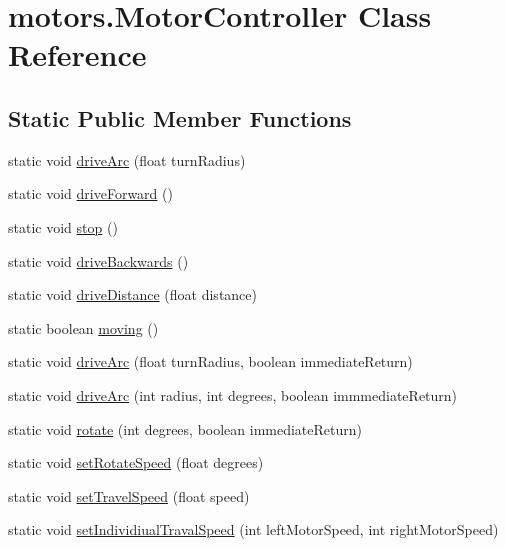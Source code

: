 \hypertarget{classmotors_1_1_motor_controller}{\section{motors.\-Motor\-Controller Class Reference}
\label{classmotors_1_1_motor_controller}
}
\subsection*{Static Public Member Functions}
\begin{DoxyCompactItemize}
\item 
static void \hyperlink{classmotors_1_1_motor_controller_a27a982c9114f012616ede0c49dd26880}{drive\-Arc} (float turn\-Radius)
\item 
static void \hyperlink{classmotors_1_1_motor_controller_a7010c7902838c03055daf3176c093bc4}{drive\-Forward} ()
\item 
static void \hyperlink{classmotors_1_1_motor_controller_ab4b6b46388aab6adb952e222d2d53f31}{stop} ()
\item 
static void \hyperlink{classmotors_1_1_motor_controller_af036b71f8836e9fcf32e0c7590b3e3e0}{drive\-Backwards} ()
\item 
static void \hyperlink{classmotors_1_1_motor_controller_ac200a0e610365d4d7f501d760e0fb5dc}{drive\-Distance} (float distance)
\item 
static boolean \hyperlink{classmotors_1_1_motor_controller_ab171d0d83a4ddcc87062b2c20721928f}{moving} ()
\item 
static void \hyperlink{classmotors_1_1_motor_controller_a6d617fcbcc35b8067bf10cdaafc94406}{drive\-Arc} (float turn\-Radius, boolean immediate\-Return)
\item 
static void \hyperlink{classmotors_1_1_motor_controller_ab99c3b5ae070cbe7034e8a49db9a59ef}{drive\-Arc} (int radius, int degrees, boolean immmediate\-Return)
\item 
static void \hyperlink{classmotors_1_1_motor_controller_a30bba3cbbbfe8fe774b21a58fba75e3b}{rotate} (int degrees, boolean immediate\-Return)
\item 
static void \hyperlink{classmotors_1_1_motor_controller_a129bd9d50a6d50c7d69e76415f798f17}{set\-Rotate\-Speed} (float degrees)
\item 
static void \hyperlink{classmotors_1_1_motor_controller_af3781222ae2e4fe3df581b14d79f3a40}{set\-Travel\-Speed} (float speed)
\item 
static void \hyperlink{classmotors_1_1_motor_controller_a13919e49cdf9aa70573a4beef99cda3c}{set\-Individiual\-Traval\-Speed} (int left\-Motor\-Speed, int right\-Motor\-Speed)

\end{DoxyCompactItemize}
